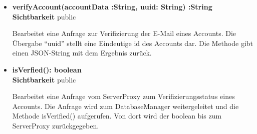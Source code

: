 \begin{itemize}
\item \textbf{verifyAccount(accountData :String, uuid: String) :String}\hfill\\
\textbf{Sichtbarkeit} public

Bearbeitet eine Anfrage zur Verifizierung der E-Mail eines Accounts. Die Übergabe ``uuid'' stellt eine Eindeutige id des Accounts dar. Die Methode gibt einen JSON-String mit dem Ergebnis zurück. 
 
\item \textbf{isVerfied(): boolean}\hfill\\
\textbf{Sichtbarkeit} public

Bearbeitet eine Anfrage vom ServerProxy zum Verifizierungsstatus eines Accounts. Die Anfrage wird zum DatabaseManager weitergeleitet und die Methode isVerified() aufgerufen. Von dort wird der boolean bis zum ServerProxy zurückgegeben.
\end{itemize}